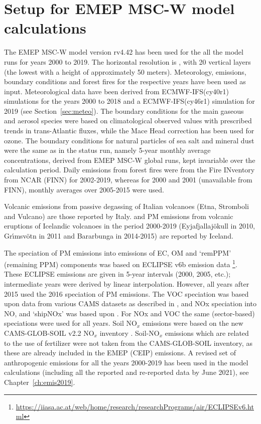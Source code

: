 

\section{\label{EMEPmodelcalc}{Setup for EMEP MSC-W model calculations}}
The EMEP MSC-W model version rv4.42 has been used for the all the model runs for years 2000 to 2019. The horizontal resolution is \resZO, with 20 vertical layers (the lowest with a height of approximately 50 meters).
 Meteorology, emissions, boundary conditions and forest fires for the respective years have been used as input. Meteorological data have been
 derived from ECMWF-IFS(cy40r1) simulations for the years 2000 to 2018 and a ECMWF-IFS(cy46r1) simulation for 2019 (see Section~\ref{sec:meteo}). 
 The boundary conditions for the main gaseous and aerosol species were based on climatological observed values with prescribed trends in trans-Atlantic fluxes, while the Mace
Head correction has been used for ozone. The boundary conditions for natural particles of
sea salt and mineral dust were the same as in the status run, namely 5-year monthly average
concentrations, derived from EMEP MSC-W global runs, kept invariable over the calculation
period.
Daily emissions from forest fires were from the Fire INventory from NCAR (FINN) for 2002-2019,
whereas for 2000 and 2001 (unavailable from FINN), monthly averages over 2005-2015 were
used.

Volcanic \sox emissions from passive degassing of Italian volcanoes (Etna,
Stromboli and Vulcano) are those reported by
Italy. \sox and PM emissions from volcanic eruptions of Icelandic volcanoes in the period 2000-2019 (Eyjafjallaj\"okull in 2010, Gr{\'{\i}}msv{\"{o}}tn in 2011  and  Bar\dh{}arbunga in 2014-2015) are reported by Iceland. 
 
The speciation of PM emissions into emissions of EC, OM and `remPPM' (remaining PPM) components was based on ECLIPSE v6b emission data \footnote{\url{https://iiasa.ac.at/web/home/research/researchPrograms/air/ECLIPSEv6.html}}. These ECLIPSE emissions are given in 5-year intervals (2000, 2005, etc.); intermediate years were derived by linear interpolation. However, all years after 2015 used the 2016 speciation of PM emissions. The VOC speciation was based upon data from various CAMS datasets as described in \cite{R2020:ModDev}, and NOx speciation into NO,  and `shipNOx' was based upon . For NOx and VOC the same (sector-based) speciations were used for all years.
Soil NO$_x$ emissions were based on the new CAMS-GLOB-SOIL v2.2 NO$_x$ inventory \citet{SimpsonDarras:2021}. Soil-NO$_x$ emissions which are related to the use of fertilizer were not taken from the CAMS-GLOB-SOIL inventory, as these are already included in the EMEP (CEIP) emissions.
A revised set of anthropogenic emissions for all the years 2000-2019 has been used in the model calculations (including all the reported and re-reported data by June 2021), see Chapter~\ref{ch:emis2019}.


